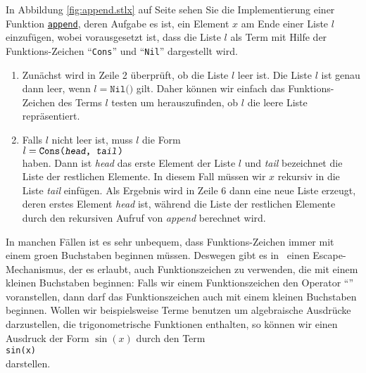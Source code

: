 In Abbildung  \ref{fig:append.stlx} auf Seite \pageref{fig:append.stlx} sehen Sie die
Implementierung  einer Funktion
\href{https://github.com/karlstroetmann/Logik/blob/master/SetlX/append.stlx}{\texttt{append}},
deren Aufgabe es ist, ein Element $x$ am Ende einer Liste $l$ einzuf\"{u}gen, wobei vorausgesetzt ist,
dass die Liste $l$ als Term mit Hilfe der Funktions-Zeichen ``\texttt{Cons}'' und ``\texttt{Nil}''
dargestellt wird.
\begin{enumerate}
\item Zun\"{a}chst wird in Zeile 2 \"{u}berpr\"{u}ft, ob die Liste $l$ leer ist.  Die Liste $l$ ist genau dann
      leer, wenn $l = \texttt{Nil()}$ gilt.  Daher k\"{o}nnen wir einfach das Funktions-Zeichen des
      Terms $l$ testen um herauszufinden, ob $l$ die leere Liste repr\"{a}sentiert.
\item Falls $l$ nicht leer ist, muss $l$ die Form
      \\[0.2cm]
      \hspace*{1.3cm}
      $l = \texttt{Cons(\textsl{head}, \textsl{tail})}$
      \\[0.2cm]     
      haben.  Dann ist \textsl{head} das erste Element der Liste $l$ und \textsl{tail} bezeichnet
      die Liste der restlichen Elemente.  In diesem Fall m\"{u}ssen wir $x$ rekursiv in die Liste
      \textsl{tail} einf\"{u}gen.  Als Ergebnis wird in Zeile 6 dann eine neue Liste erzeugt, deren
      erstes Element \textsl{head} ist, w\"{a}hrend die Liste der restlichen Elemente durch den
      rekursiven Aufruf von \textsl{append} berechnet wird.
\end{enumerate}
In manchen F\"{a}llen ist es sehr unbequem, dass Funktions-Zeichen immer mit einem gro\3en Buchstaben
beginnen m\"{u}ssen.  Deswegen gibt es in \setl\ einen Escape-Mechanismus, der es erlaubt, auch
Funktionszeichen zu verwenden, die mit einem kleinen Buchstaben beginnen:  Falls wir einem
Funktionszeichen den Operator ``\texttt{}'' voranstellen, dann darf das Funktionszeichen
auch mit einem kleinen Buchstaben beginnen.  Wollen wir beispielsweise Terme benutzen um
algebraische Ausdr\"{u}cke darzustellen, die trigonometrische Funktionen enthalten, 
so k\"{o}nnen wir einen Ausdruck der Form $\sin(x)$ durch den Term
\\[0.2cm]
\hspace*{1.3cm}
\texttt{sin(x)}  
\\[0.2cm]
darstellen.

